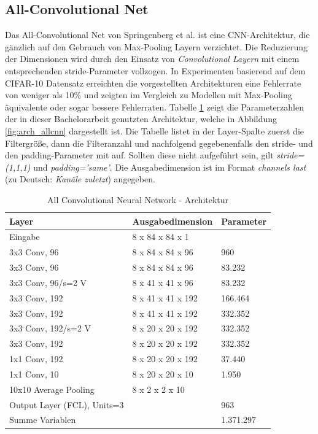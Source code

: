 \subsection{All-Convolutional Net}
Das All-Convolutional Net von Springenberg et al. \parencite{DBLP:journals/corr/SpringenbergDBR14} ist eine CNN-Architektur, die g\"anzlich auf den Gebrauch von Max-Pooling Layern verzichtet. Die Reduzierung der Dimensionen wird durch den Einsatz von \textit{Convolutional Layern} mit einem entsprechenden stride-Parameter vollzogen. In Experimenten basierend auf dem CIFAR-10 Datensatz erreichten die vorgestellten Architekturen eine Fehlerrate von weniger als 10\% und zeigten im Vergleich zu Modellen mit Max-Pooling äquivalente oder sogar bessere Fehlerraten. Tabelle \ref{tb:arch_allcnn} zeigt die Parameterzahlen der in dieser Bachelorarbeit genutzten Architektur, welche in Abbildung \ref{fig:arch_allcnn} dargestellt ist. Die Tabelle listet in der Layer-Spalte zuerst die Filtergr\"o\ss{}e, dann die Filteranzahl und nachfolgend gegebenenfalls den stride- und den padding-Parameter mit auf. Sollten diese nicht aufgef\"uhrt sein, gilt \textit{stride=(1,1,1)} und \textit{padding='same'}. Die Ausgabedimension ist im Format \textit{channels last} (zu Deutsch: \textit{Kanäle zuletzt}) angegeben. 

\begin{table}
\centering
\caption{All Convolutional Neural Network - Architektur}
\begin{tabular}{@{}lll@{}}
\hline
Layer & Ausgabedimension & Parameter\\
\hline
Eingabe & 8 x 84 x 84 x 1 & \\
3x3 Conv, 96 & 8 x 84 x 84 x 96 & 960\\
3x3 Conv, 96 & 8 x 84 x 84 x 96 & 83.232\\ 
3x3 Conv, 96/s=2 V & 8 x 41 x 41 x 96 & 83.232\\ 
3x3 Conv, 192 & 8 x 41 x 41 x 192 & 166.464\\
3x3 Conv, 192 & 8 x 41 x 41 x 192 & 332.352\\
3x3 Conv, 192/s=2 V & 8 x 20 x 20 x 192 & 332.352\\
3x3 Conv, 192 & 8 x 20 x 20 x 192 & 332.352\\
1x1 Conv, 192 & 8 x 20 x 20 x 192 & 37.440\\
1x1 Conv, 10 & 8 x 20 x 20 x 10 & 1.950\\
10x10 Average Pooling & 8 x 2 x 2 x 10 & \\
Output Layer (FCL), Units=3 & & 963\\
\hline
Summe Variablen & & 1.371.297\\
\hline
\end{tabular}
\label{tb:arch_allcnn}
\end{table}

